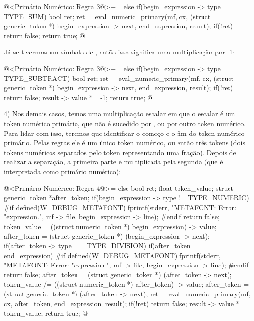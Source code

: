 \iniciocodigo
@<Primário Numérico: Regra 3@>+=
else if(begin_expression -> type == TYPE_SUM){
  bool ret;
  ret = eval_numeric_primary(mf, cx, (struct generic_token *)
                             begin_expression -> next,
                             end_expression, result);
  if(!ret)
    return false;
  return true;
}
@
\fimcodigo

Já se tivermos um símbolo de \monoespaco{-}, então isso significa uma
multiplicação por -1:

\iniciocodigo
@<Primário Numérico: Regra 3@>+=
else if(begin_expression -> type == TYPE_SUBTRACT){
  bool ret;
  ret = eval_numeric_primary(mf, cx, (struct generic_token *)
                             begin_expression -> next,
                             end_expression, result);
  if(!ret)
    return false;
  result -> value *= -1;
  return true;
}
@
\fimcodigo


4) Nos demais casos, temos uma multiplicação escalar em que o escalar
é um token numérico primário, que não é sucedido
por \monoespaco{+}, \monoespaco{-} ou por outro token numérico. Para
lidar com isso, teremos que identificar o começo e o fim do token
numérico primário. Pelas regras ele é um único token numérico, ou
então três tokens (dois tokens numéricos separados pelo
token \monoespaco{/} representando uma fração). Depois de realizar a
separação, a primeira parte é multiplicada pela segunda (que é
interpretada como primário numérico):

\iniciocodigo
@<Primário Numérico: Regra 4@>=
else{
  bool ret;
  float token_value;
  struct generic_token *after_token;
  if(begin_expression -> type != TYPE_NUMERIC){
#if defined(W_DEBUG_METAFONT)
    fprintf(stderr, "METAFONT: Error: %
            "expression.\n", mf -> file, begin_expression -> line);
#endif
    return false;
  }
  token_value = ((struct numeric_token *) begin_expression) -> value;
  after_token = (struct generic_token *) (begin_expression -> next);
  if(after_token -> type == TYPE_DIVISION){
    if(after_token == end_expression){
#if defined(W_DEBUG_METAFONT)
      fprintf(stderr, "METAFONT: Error: %
              "expression.\n", mf -> file, begin_expression -> line);
#endif
      return false;
    }
    after_token = (struct generic_token *) (after_token -> next);
    token_value /= ((struct numeric_token *) after_token) -> value;
    after_token = (struct generic_token *) (after_token -> next);
  }
  ret = eval_numeric_primary(mf, cx, after_token, end_expression, result);
  if(!ret)
    return false;
  result -> value *= token_value;
  return true;
}
@
\fimcodigo

